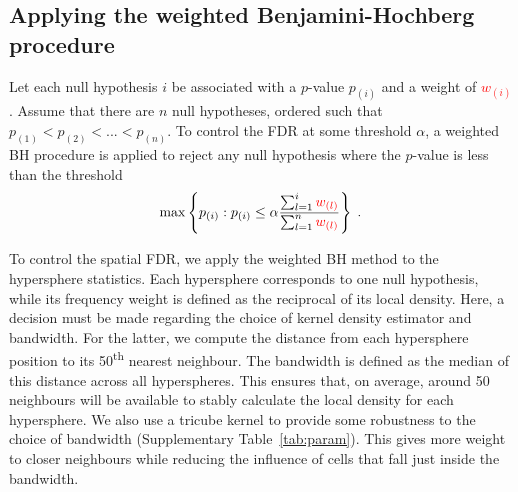\documentclass{article}
\newcommand\revised[1]{\textcolor{red}{#1}}
\begin{document}
\subsection{Applying the weighted Benjamini-Hochberg procedure}
Let each null hypothesis $i$ be associated with a $p$-value $p_{(i)}$ and a weight of \revised{$w_{(i)}$}.
Assume that there are $n$ null hypotheses, ordered such that $p_{(1)} < p_{(2)} < ... < p_{(n)}$.
To control the FDR at some threshold $\alpha$, a weighted BH procedure is applied \cite{benjamini1997multiple} to reject any null hypothesis where the $p$-value is less than the threshold
\[
    \max\left\{ p_{(i)} : p_{(i)} \le \alpha \frac{\sum_{l=1}^{i} \revised{w_{(l)}}}{\sum_{l=1}^{n} \revised{w_{(l)}}} \right\}  \;.
\]

To control the spatial FDR, we apply the weighted BH method to the hypersphere statistics.
Each hypersphere corresponds to one null hypothesis, while its frequency weight is defined as the reciprocal of its local density.
Here, a decision must be made regarding the choice of kernel density estimator and bandwidth.
For the latter, we compute the distance from each hypersphere position to its 50\textsuperscript{th} nearest neighbour.
The bandwidth is defined as the median of this distance across all hyperspheres.
This ensures that, on average, around 50 neighbours will be available to stably calculate the local density for each hypersphere.
We also use a tricube kernel to provide some robustness to the choice of bandwidth (Supplementary Table~\ref{tab:param}).
This gives more weight to closer neighbours while reducing the influence of cells that fall just inside the bandwidth.
\end{document}
